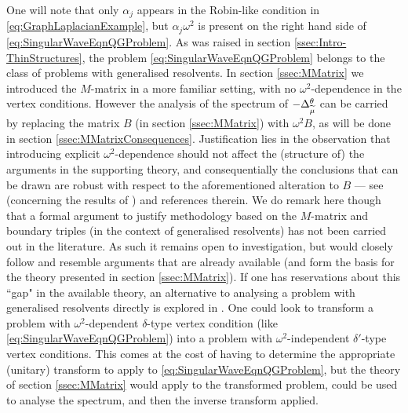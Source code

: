 One will note that only $\alpha_j$ appears in the Robin-like condition in \eqref{eq:GraphLaplacianExample}, but $\alpha_j\omega^2$ is present on the right hand side of \eqref{eq:SingularWaveEqnQGProblem}.
As was raised in section \ref{ssec:Intro-ThinStructures}, the problem \eqref{eq:SingularWaveEqnQGProblem} belongs to the class of problems with generalised resolvents.
In section \ref{ssec:MMatrix} we introduced the $M$-matrix in a more familiar setting, with no $\omega^2$-dependence in the vertex conditions.
However the analysis of the spectrum of $-\Delta_{\widetilde{\mu}}^{\theta}$ can be carried by replacing the matrix $B$ (in section \ref{ssec:MMatrix}) with $\omega^2 B$, as will be done in section \ref{ssec:MMatrixConsequences}.
Justification lies in the observation that introducing explicit $\omega^2$-dependence should not affect the (structure of) the arguments in the supporting theory, and consequentially the conclusions that can be drawn are robust with respect to the aforementioned alteration to $B$ --- see \cite[page 1846]{cherednichenko2018effective} (concerning the results of ) and references therein.
We do remark here though that a formal argument to justify methodology based on the $M$-matrix and boundary triples (in the context of generalised resolvents) has not been carried out in the literature.
As such it remains open to investigation, but would closely follow and resemble arguments that are already available (and form the basis for the theory presented in section \ref{ssec:MMatrix}).
If one has reservations about this ``gap" in the available theory, an alternative to analysing a problem with generalised resolvents directly is explored in \cite[Section 6]{cherednichenko2017norm}.
One could look to transform a problem with $\omega^2$-dependent $\delta$-type vertex condition (like \eqref{eq:SingularWaveEqnQGProblem}) into a problem with $\omega^2$-independent $\delta'$-type vertex conditions.
This comes at the cost of having to determine the appropriate (unitary) transform to apply to \eqref{eq:SingularWaveEqnQGProblem}, but the theory of section \ref{ssec:MMatrix} would apply to the transformed problem, could be used to analyse the spectrum, and then the inverse transform applied.


